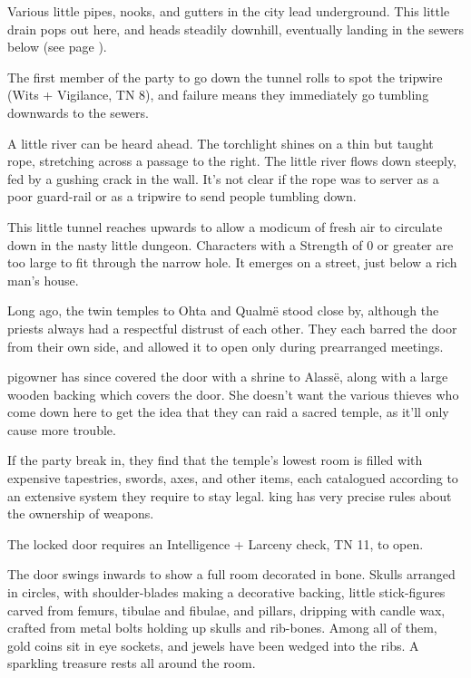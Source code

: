 \begin{multicols}{2}


Various little pipes, nooks, and gutters in the city lead underground.
This little drain pops out here, and heads steadily downhill, eventually landing in the sewers below (see page \pageref{slidein}).

The first member of the party to go down the tunnel rolls to spot the tripwire (Wits + Vigilance, TN 8), and failure means they immediately go tumbling downwards to the sewers.

\begin{boxtext}

	A little river can be heard ahead.
	The torchlight shines on a thin but taught rope, stretching across a passage to the right.
	The little river flows down steeply, fed by a gushing crack in the wall.
	It's not clear if the rope was to server as a poor guard-rail or as a tripwire to send people tumbling down.

\end{boxtext}


This little tunnel reaches upwards to allow a modicum of fresh air to circulate down in the nasty little dungeon.  Characters with a Strength of 0 or greater are too large to fit through the narrow hole.  It emerges on a street, just below a rich man's house.

Long ago, the twin temples to Ohta and Qualm\"{e} stood close by, although the priests always had a respectful distrust of each other.
They each barred the door from their own side, and allowed it to open only during prearranged meetings.

\Gls{pigowner} has since covered the door with a shrine to Alass\"{e}, along with a large wooden backing which covers the door.  She doesn't want the various thieves who come down here to get the idea that they can raid a sacred temple, as it'll only cause more trouble.

If the party break in, they find that the temple's lowest room is filled with expensive tapestries, swords, axes, and other items, each catalogued according to an extensive system they require to stay legal.  \Gls{king} has very precise rules about the ownership of weapons.

The locked door requires an Intelligence + Larceny check, TN 11, to open.

\begin{boxtext}
	The door swings inwards to show a full room decorated in bone.
	Skulls arranged in circles, with shoulder-blades making a decorative backing, little stick-figures carved from femurs, tibulae and fibulae, and pillars, dripping with candle wax, crafted from metal bolts holding up skulls and rib-bones.
	Among all of them, gold coins sit in eye sockets, and jewels have been wedged into the ribs.
	A sparkling treasure rests all around the room.


\end{boxtext}
\end{multicols}
